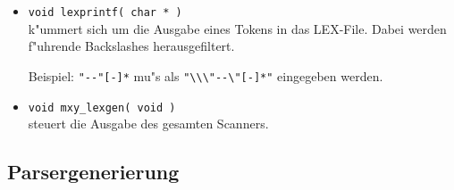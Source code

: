 \begin{itemize}
\item {\tt void lexprintf( char * )}\\
k"ummert sich um die Ausgabe eines Tokens in das LEX-File.
Dabei werden f"uhrende Backslashes herausgefiltert.

Beispiel: \verb|"--"[-]*| mu"s als \verb|"\\\"--\"[-]*"| eingegeben werden.

\item {\tt void mxy\_lexgen( void )}\\
steuert die Ausgabe des gesamten Scanners.
\end{itemize}

\subsection{Parsergenerierung}

